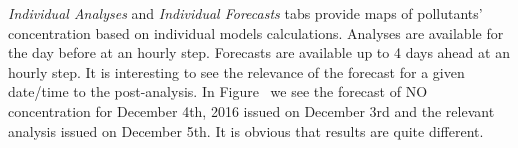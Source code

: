 \documentclass[9pt]{report}
\begin{document}
\noindent{}\emph{Individual Analyses} and \emph{Individual Forecasts} tabs provide maps of pollutants' concentration based on individual models calculations.
Analyses are available for the day before at an hourly step.
Forecasts are available up to 4 days ahead at an hourly step.
It is interesting to see the relevance of the forecast for a given date/time to the post-analysis.
In Figure~ we see the forecast of NO concentration for December 4th, 2016 issued on December 3rd and the relevant analysis issued on December 5th.
It is obvious that results are quite different.%

\begin{figure}[h!]%
\begin{mdcenter}%
\end{mdcenter}
\end{figure}
\end{document}

